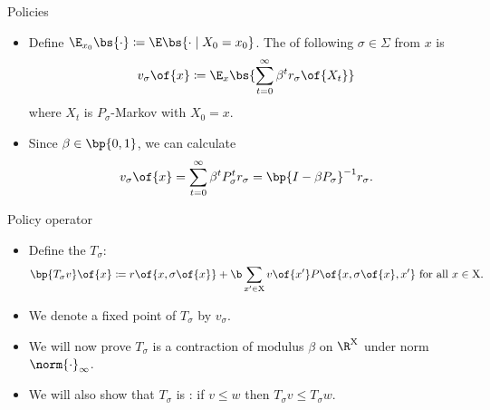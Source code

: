 \documentclass[11pt,xcolor={dvipsnames},aspectratio=159,hyperref={pdftex,pdfpagemode=UseNone,hidelinks,pdfdisplaydoctitle=true},usepdftitle=false]{beamer}
\begin{document}
\begin{frame}{Policies}   
    \begin{itemize}
        \item Define $\E_{x_0}\bs{\cdot} \coloneq \E\bs{\cdot \mid X_0 = x_0}$. The  of following $\sigma\in\Sigma$ from $x$ is \begin{align*}
            v_\sigma\of{x} \coloneq \E_{x}\bs{\sum_{t=0}^\infty \beta^t r_\sigma\of{X_t}}
        \end{align*}
      where $X_t$ is $P_\sigma$-Markov with $X_0 = x$.
      \item Since $\beta \in \bp{0,1}$, we can calculate \begin{align*}
        v_\sigma\of{x} = \sum_{t=0}^\infty \beta^t P^t_\sigma r_\sigma = \bp{I - \beta P_\sigma}^{-1} r_\sigma. 
      \end{align*}
    \end{itemize}
    \end{frame}

\begin{frame}{Policy operator}   
    \begin{itemize}
        \item Define the  $T_\sigma$:\begin{align*}
            \bp{T_\sigma v}\of{x} \coloneq r\of{x,\sigma\of{x}} + \b \sum_{x^\prime \in \text{X}} v\of{x^\prime} P\of{x,\sigma\of{x},x^\prime} \text{ for all } x \in \text{X}.
        \end{align*}
        \item We denote a fixed point of $T_\sigma$ by $v_\sigma$.
        \item We will now prove $T_\sigma$ is a contraction of modulus $\beta$ on $\R^\text{X}$ under norm $\norm{\cdot}_\infty$.
        \item We will also show that $T_\sigma$ is : if $v \leq w$ then $T_\sigma v \leq T_\sigma w$.
    \end{itemize}
    \end{frame}
\end{document}
